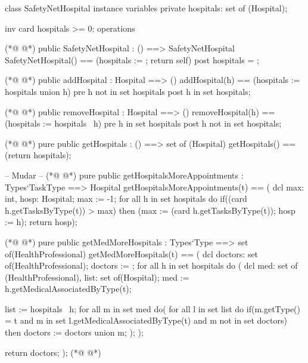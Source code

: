 \begin{vdmpp}[breaklines=true]
class SafetyNetHospital
instance variables
 private hospitals: set of (Hospital);
 
 inv card hospitals >= 0;
operations

(*@
\label{SafetyNetHospital:8}
@*)
 public SafetyNetHospital : () ==> SafetyNetHospital
  SafetyNetHospital() == (hospitals := {}; return self)
 post hospitals = {};
  
(*@
\label{addHospital:12}
@*)
 public addHospital : Hospital ==> ()
  addHospital(h) == (hospitals := hospitals union {h})
 pre h not in set hospitals
 post h in set hospitals;
 
(*@
\label{removeHospital:17}
@*)
 public removeHospital : Hospital ==> ()
  removeHospital(h) == (hospitals := hospitals \ {h})
 pre h in set hospitals
 post h not in set hospitals;
 
(*@
\label{getHospitals:22}
@*)
 pure public getHospitals : () ==> set of (Hospital)
  getHospitals() == (return hospitals);
 
 -- Mudar -- 
(*@
\label{getHospitalsMoreAppointments:26}
@*)
 pure public getHospitalsMoreAppointments : Types`TaskType ==> Hospital
  getHospitalsMoreAppointments(t) == (
                    dcl max: int, hosp: Hospital;
                    max := -1;
                    for all h in set hospitals do
                     if((card h.getTasksByType(t)) > max)
                      then (max := (card h.getTasksByType(t)); hosp := h);
                    return hosp);
 
(*@
\label{getMedMoreHospitals:35}
@*)
 pure public getMedMoreHospitals : Types`Type ==> set of(HealthProfessional)
  getMedMoreHospitals(t) == (
                  dcl doctors: set of(HealthProfessional);
                  doctors := {};
                  for all h in set hospitals do (
                   dcl med: set of (HealthProfessional), list: set of(Hospital);
                   med := h.getMedicalAssociatedByType(t);
                   
                   list := hospitals \ {h};
                   for all m in set med do(
                    for all l in set list do
                     if(m.getType() = t and m in set l.getMedicalAssociatedByType(t) and m not in set doctors)
                      then doctors := doctors union {m};
                   );
                  );
                  
                  return doctors;
                 );
(*@
\label{getMedAssociatedByPatient:53}
@*)
                               

\end{vdmpp}
